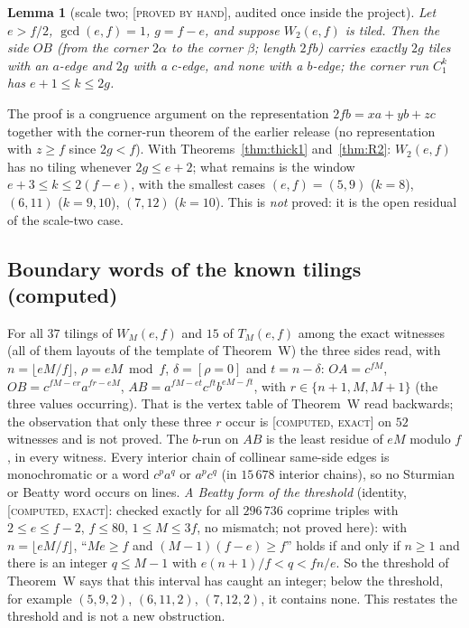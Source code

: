 \documentclass[11pt,reqno]{amsart}
\theoremstyle{plain}
\newtheorem{lemma}[theorem]{Lemma}
\theoremstyle{definition}
\newcommand{\lab}[1]{\textup{[\textsc{#1}]}}
\newcommand{\PH}{\lab{proved by hand}}
\newcommand{\CE}{\lab{computed, exact}}
\begin{document}
\begin{lemma}[scale two; \PH{}, audited once inside the project]\label{lem:W2}
Let $e>f/2$, $\gcd(e,f)=1$, $g=f-e$, and suppose $W_2(e,f)$ is tiled. Then the side $OB$ (from the corner $2\alpha$ to the corner $\beta$; length $2fb$) carries exactly $2g$ tiles with an $a$-edge and $2g$ with a $c$-edge, and none with a $b$-edge; the corner run $C_1^k$ has $e+1\le k\le 2g$.
\end{lemma}
The proof is a congruence argument on the representation $2fb=xa+yb+zc$ together with the corner-run theorem of the earlier release (no representation with $z\ge f$ since $2g<f$). With Theorems~\ref{thm:thick1} and~\ref{thm:R2}: $W_2(e,f)$ has no tiling whenever $2g\le e+2$; what remains is the window $e+3\le k\le 2(f-e)$, with the smallest cases $(e,f)=(5,9)$ ($k=8$), $(6,11)$ ($k=9,10$), $(7,12)$ ($k=10$). This is \emph{not} proved: it is the open residual of the scale-two case.

\subsection*{Boundary words of the known tilings (computed)}
For all $37$ tilings of $W_M(e,f)$ and $15$ of $T_M(e,f)$ among the exact witnesses (all of them layouts of the template of Theorem~W) the three sides read, with $n=\lfloor eM/f\rfloor$, $\rho=eM\bmod f$, $\delta=[\rho=0]$ and $t=n-\delta$:
$OA=c^{fM}$, $OB=c^{fM-er}a^{fr-eM}$, $AB=a^{fM-et}c^{ft}b^{eM-ft}$, with $r\in\{n+1,M,M+1\}$ (the three values occurring). That is the vertex table of Theorem~W read backwards; the observation that only these three $r$ occur is \CE{} on $52$ witnesses and is not proved. The $b$-run on $AB$ is the least residue of $eM$ modulo $f$, in every witness. Every interior chain of collinear same-side edges is monochromatic or a word $c^pa^q$ or $a^pc^q$ (in $15\,678$ interior chains), so no Sturmian or Beatty word occurs on lines.
\emph{A Beatty form of the threshold} (identity, \CE{}: checked exactly for all $296\,736$ coprime triples with $2\le e\le f-2$, $f\le80$, $1\le M\le3f$, no mismatch; not proved here): with $n=\lfloor eM/f\rfloor$, ``$Me\ge f$ and $(M-1)(f-e)\ge f$'' holds if and only if $n\ge1$ and there is an integer $q\le M-1$ with $e(n+1)/f<q<fn/e$. So the threshold of Theorem~W says that this interval has caught an integer; below the threshold, for example $(5,9,2)$, $(6,11,2)$, $(7,12,2)$, it contains none. This restates the threshold and is not a new obstruction.
\end{document}
